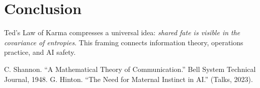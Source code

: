 \documentclass[11pt]{article}
\begin{document}
\section{Conclusion}
Ted's Law of Karma compresses a universal idea: 
\emph{shared fate is visible in the covariance of entropies}.
This framing connects information theory, operations practice, and AI safety.


\begin{thebibliography}{9}
 C. Shannon. ``A Mathematical Theory of Communication.'' Bell System Technical Journal, 1948.
 G. Hinton. ``The Need for Maternal Instinct in AI.'' (Talks, 2023).
\end{thebibliography}
\end{document}
